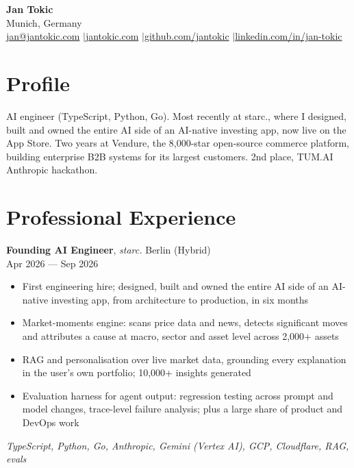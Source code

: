 \documentclass[a4paper,10pt]{article}
\newcommand{\entry}[4]{%
  \textbf{#1}, \textit{#2} \hfill #3 \\ \vspace{-2pt}
  {\small #4}%
}
\begin{document}
\begin{center}
  {\LARGE\bfseries Jan Tokic} \\[2pt]
  Munich, Germany \\[1pt]
  \href{mailto:jan@jantokic.com}{jan@jantokic.com} \enspace$\vert$\enspace \href{https://jantokic.com}{jantokic.com} \enspace$\vert$\enspace \href{https://github.com/jantokic}{github.com/jantokic} \enspace$\vert$\enspace \href{https://linkedin.com/in/jan-tokic}{linkedin.com/in/jan-tokic}
\end{center}

\vspace{-4pt}

\section{Profile}
AI engineer (TypeScript, Python, Go). Most recently at starc., where I designed, built and owned the entire AI side of an AI-native investing app, now live on the App Store. Two years at Vendure, the 8,000-star open-source commerce platform, building enterprise B2B systems for its largest customers. 2nd place, TUM.AI \texttimes{} Anthropic hackathon.

\section{Professional Experience}

\entry{Founding AI Engineer}{starc.}{Berlin (Hybrid)}{Apr 2026 --- Sep 2026}
\begin{itemize}
  \item First engineering hire; designed, built and owned the entire AI side of an AI-native investing app, from architecture to production, in six months
  \item Market-moments engine: scans price data and news, detects significant moves and attributes a cause at macro, sector and asset level across 2,000+ assets
  \item RAG and personalisation over live market data, grounding every explanation in the user's own portfolio; 10,000+ insights generated
  \item Evaluation harness for agent output: regression testing across prompt and model changes, trace-level failure analysis; plus a large share of product and DevOps work
\end{itemize}
{\small\textit{TypeScript, Python, Go, Anthropic, Gemini (Vertex AI), GCP, Cloudflare, RAG, evals}}
\end{document}
